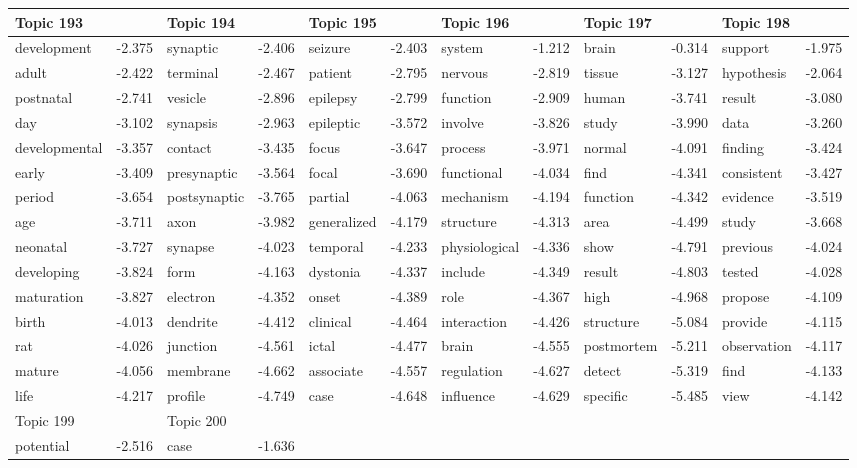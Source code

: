 \documentclass{article}
\begin{document}
\begin{table}
{\begin{tabular}{|l r|l r|l r|l r|l r|l r|}
\hline
\hline
Topic 193 & &Topic 194 & &Topic 195 & &Topic 196 & &Topic 197 & &Topic 198 &\\
\hline
development & -2.375 & synaptic & -2.406 & seizure & -2.403 & system & -1.212 & brain & -0.314 & support & -1.975\\
adult & -2.422 & terminal & -2.467 & patient & -2.795 & nervous & -2.819 & tissue & -3.127 & hypothesis & -2.064\\
postnatal & -2.741 & vesicle & -2.896 & epilepsy & -2.799 & function & -2.909 & human & -3.741 & result & -3.080\\
day & -3.102 & synapsis & -2.963 & epileptic & -3.572 & involve & -3.826 & study & -3.990 & data & -3.260\\
developmental & -3.357 & contact & -3.435 & focus & -3.647 & process & -3.971 & normal & -4.091 & finding & -3.424\\
early & -3.409 & presynaptic & -3.564 & focal & -3.690 & functional & -4.034 & find & -4.341 & consistent & -3.427\\
period & -3.654 & postsynaptic & -3.765 & partial & -4.063 & mechanism & -4.194 & function & -4.342 & evidence & -3.519\\
age & -3.711 & axon & -3.982 & generalized & -4.179 & structure & -4.313 & area & -4.499 & study & -3.668\\
neonatal & -3.727 & synapse & -4.023 & temporal & -4.233 & physiological & -4.336 & show & -4.791 & previous & -4.024\\
developing & -3.824 & form & -4.163 & dystonia & -4.337 & include & -4.349 & result & -4.803 & tested & -4.028\\
maturation & -3.827 & electron & -4.352 & onset & -4.389 & role & -4.367 & high & -4.968 & propose & -4.109\\
birth & -4.013 & dendrite & -4.412 & clinical & -4.464 & interaction & -4.426 & structure & -5.084 & provide & -4.115\\
rat & -4.026 & junction & -4.561 & ictal & -4.477 & brain & -4.555 & postmortem & -5.211 & observation & -4.117\\
mature & -4.056 & membrane & -4.662 & associate & -4.557 & regulation & -4.627 & detect & -5.319 & find & -4.133\\
life & -4.217 & profile & -4.749 & case & -4.648 & influence & -4.629 & specific & -5.485 & view & -4.142\\
\hline
\hline
Topic 199 & &Topic 200 &\\
\hline
potential & -2.516 & case & -1.636\\

\end{tabular}}
\end{table}
\end{document}
